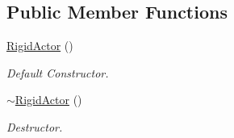 \subsection*{Public Member Functions}
\begin{DoxyCompactItemize}
\item 
\hypertarget{classContent_1_1Actor_1_1Physics_1_1RigidActor_abaf2acc43a1108c9da1b59ac73540da0}{
\hyperlink{classContent_1_1Actor_1_1Physics_1_1RigidActor_abaf2acc43a1108c9da1b59ac73540da0}{RigidActor} ()}
\label{classContent_1_1Actor_1_1Physics_1_1RigidActor_abaf2acc43a1108c9da1b59ac73540da0}

\begin{DoxyCompactList}\small\item\em Default Constructor. \item\end{DoxyCompactList}\item 
\hypertarget{classContent_1_1Actor_1_1Physics_1_1RigidActor_abc17971b4cc3927aaccbfc6442201f40}{
\hyperlink{classContent_1_1Actor_1_1Physics_1_1RigidActor_abc17971b4cc3927aaccbfc6442201f40}{$\sim$RigidActor} ()}
\label{classContent_1_1Actor_1_1Physics_1_1RigidActor_abc17971b4cc3927aaccbfc6442201f40}

\begin{DoxyCompactList}\small\item\em Destructor. \item\end{DoxyCompactList}\end{DoxyCompactItemize}
